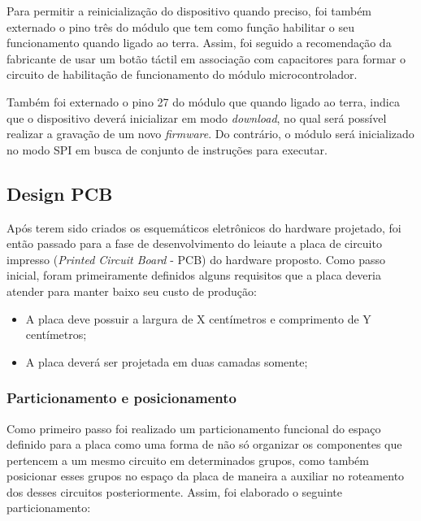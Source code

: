 Para permitir a reinicialização do dispositivo quando preciso, foi também externado o pino três do módulo que tem como função habilitar o seu funcionamento quando ligado ao terra. Assim, foi seguido a recomendação da fabricante de usar um botão táctil em associação com capacitores para formar o circuito de habilitação de funcionamento do módulo microcontrolador.

Também foi externado o pino 27 do módulo que quando ligado ao terra, indica que o dispositivo deverá inicializar em modo \textit{download}, no qual será possível realizar a gravação de um novo \textit{firmware}. Do contrário, o módulo será inicializado no modo SPI em busca de conjunto de instruções para executar. 

\subsection{Design PCB}




Após terem sido criados os esquemáticos eletrônicos do hardware projetado, foi então passado para a fase de desenvolvimento do leiaute a placa de circuito impresso (\textit{Printed Circuit Board} - PCB) do hardware proposto. Como passo inicial, foram primeiramente definidos alguns requisitos que a placa deveria atender para manter baixo seu custo de produção:

\begin{itemize}
    \item A placa deve possuir a largura de X centímetros e comprimento de Y centímetros;
    
    \item A placa deverá ser projetada em duas camadas somente; 
\end{itemize}


\subsubsection{Particionamento e posicionamento}

Como primeiro passo foi realizado um particionamento funcional do espaço definido para a placa como uma forma de não só organizar os componentes que pertencem a um mesmo circuito em determinados grupos, como também posicionar esses grupos no espaço da placa de maneira a auxiliar no roteamento dos desses circuitos posteriormente. Assim, foi elaborado o seguinte particionamento:


